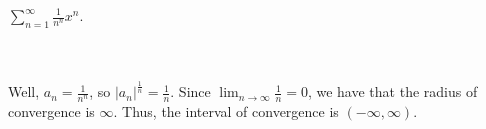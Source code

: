 $\sum_{n=1}^{\infty} \frac{1}{n^n}x^n$.\\\\

\begin{solution}\renewcommand{\qedsymbol}{}\ \\
    Well, $a_n=\frac{1}{n^n}$, so $|a_n|^{\frac{1}{n}}=\frac{1}{n}$. Since
    $\lim_{n\to\infty} \frac1n=0$, we have that the radius of convergence is $\infty$. Thus, the
    interval of convergence is $(-\infty ,\infty)$.

\end{solution}
